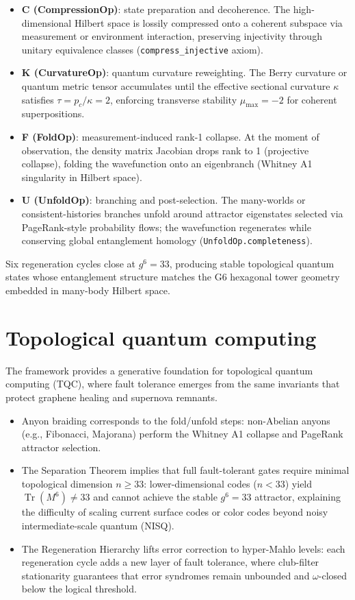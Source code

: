 \documentclass[19pt]{book}
\theoremstyle{plain}
\theoremstyle{definition}
\theoremstyle{remark}
\begin{document}
\begin{itemize}
\item \textbf{C (CompressionOp)}: state preparation and decoherence. The high-dimensional Hilbert space is lossily compressed onto a coherent subspace via measurement or environment interaction, preserving injectivity through unitary equivalence classes (\texttt{compress\_injective} axiom).
\item \textbf{K (CurvatureOp)}: quantum curvature reweighting. The Berry curvature or quantum metric tensor accumulates until the effective sectional curvature \(\kappa\) satisfies \(\tau = p_c / \kappa = 2\), enforcing transverse stability \(\mu_{\max} = -2\) for coherent superpositions.
\item \textbf{F (FoldOp)}: measurement-induced rank-1 collapse. At the moment of observation, the density matrix Jacobian drops rank to 1 (projective collapse), folding the wavefunction onto an eigenbranch (Whitney A1 singularity in Hilbert space).
\item \textbf{U (UnfoldOp)}: branching and post-selection. The many-worlds or consistent-histories branches unfold around attractor eigenstates selected via PageRank-style probability flows; the wavefunction regenerates while conserving global entanglement homology (\texttt{UnfoldOp.completeness}).
\end{itemize}

Six regeneration cycles close at \(g^6 = 33\), producing stable topological quantum states whose entanglement structure matches the G6 hexagonal tower geometry embedded in many-body Hilbert space.

\section{Topological quantum computing}

The framework provides a generative foundation for topological quantum computing (TQC), where fault tolerance emerges from the same invariants that protect graphene healing and supernova remnants.

\begin{itemize}
\item Anyon braiding corresponds to the fold/unfold steps: non-Abelian anyons (e.g., Fibonacci, Majorana) perform the Whitney A1 collapse and PageRank attractor selection.
\item The Separation Theorem implies that full fault-tolerant gates require minimal topological dimension \(n \ge 33\): lower-dimensional codes (\(n < 33\)) yield \(\operatorname{Tr}(M^6) \neq 33\) and cannot achieve the stable \(g^6 = 33\) attractor, explaining the difficulty of scaling current surface codes or color codes beyond noisy intermediate-scale quantum (NISQ).
\item The Regeneration Hierarchy lifts error correction to hyper-Mahlo levels: each regeneration cycle adds a new layer of fault tolerance, where club-filter stationarity guarantees that error syndromes remain unbounded and \(\omega\)-closed below the logical threshold.
\end{itemize}
\end{document}
